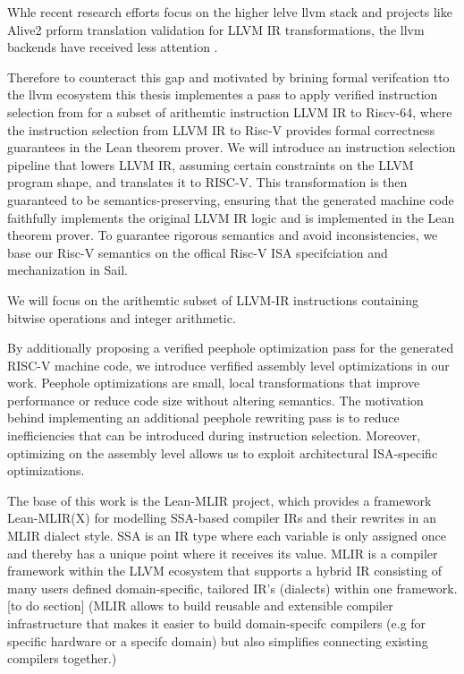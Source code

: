 Whle recent research efforts focus on the higher lelve llvm stack and projects like Alive2 prform translation validation for LLVM IR transformations, the llvm backends have received less attention .

Therefore to counteract this gap and motivated by brining formal verifcation tto the llvm ecosystem this thesis implementes a pass to apply verified instruction selection from   for a subset of arithemtic instruction LLVM IR to Riscv-64, where the instruction selection from LLVM IR to Risc-V  provides formal correctness guarantees in the Lean theorem prover. We will introduce an instruction selection pipeline that lowers LLVM IR, assuming certain constraints on the LLVM program shape, and translates it to RISC-V. This transformation is then guaranteed to be semantics-preserving, ensuring that the generated machine code faithfully implements the original LLVM IR logic and is implemented in the Lean theorem prover. To guarantee rigorous semantics and avoid inconsistencies, we base our Risc-V semantics on the offical Risc-V ISA specifciation  and mechanization in Sail. 

We will focus on the arithemtic subset of LLVM-IR instructions containing bitwise operations and integer arithmetic.

By additionally proposing a verified peephole optimization pass for the generated RISC-V machine code, we introduce verfified assembly level optimizations in our work. Peephole optimizations are small, local transformations that improve performance or reduce code size without altering semantics. The motivation behind implementing an additional peephole rewriting pass is to reduce inefficiencies that can be introduced during instruction selection. Moreover, optimizing on the assembly level allows us to exploit architectural ISA-specific optimizations.

The base of this work is the Lean-MLIR project, which provides a framework Lean-MLIR(X) for modelling SSA-based compiler IRs and their rewrites in an MLIR dialect style. SSA is an IR type where each variable is only assigned once and thereby has a unique point where it receives its value. MLIR is a compiler framework within the LLVM ecosystem that supports a hybrid IR consisting of many users defined domain-specific, tailored IR’s (dialects) within one framework.[to do section] (MLIR allows to build reusable and extensible compiler infrastructure that makes it easier to build domain-specifc compilers (e.g for specific hardware or a specifc domain) but also simplifies connecting existing compilers together.)


